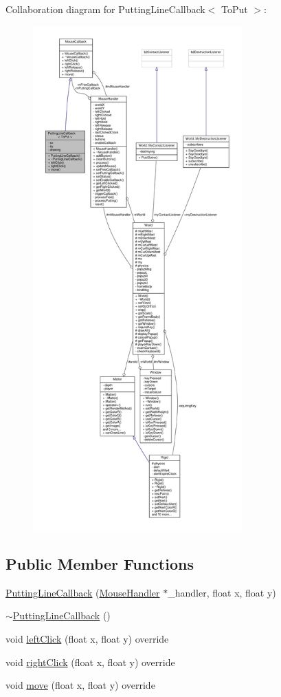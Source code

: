 Collaboration diagram for Putting\+Line\+Callback$<$ To\+Put $>$\+:
\nopagebreak
\begin{figure}[H]
\begin{center}
\leavevmode
\includegraphics[height=550pt]{classPuttingLineCallback__coll__graph}
\end{center}
\end{figure}
\subsection*{Public Member Functions}
\begin{DoxyCompactItemize}
\item 
\hyperlink{classPuttingLineCallback_a7bf8b242abd061bbe1724f837c379ea2}{Putting\+Line\+Callback} (\hyperlink{classMouseHandler}{Mouse\+Handler} $\ast$\+\_\+handler, float x, float y)
\item 
\hyperlink{classPuttingLineCallback_a3835ab594c3a188eae9d8beff4802e5f}{$\sim$\+Putting\+Line\+Callback} ()
\item 
void \hyperlink{classPuttingLineCallback_a5a4c924a90e4b2ec3a359ae1f958d168}{left\+Click} (float x, float y) override
\item 
void \hyperlink{classPuttingLineCallback_a87d406ea7eb6fb24f2777b9bb8032a5a}{right\+Click} (float x, float y) override
\item 
void \hyperlink{classPuttingLineCallback_abc6f400a8e408faa4ae2ebbc8eef8dca}{move} (float x, float y) override
\end{DoxyCompactItemize}
